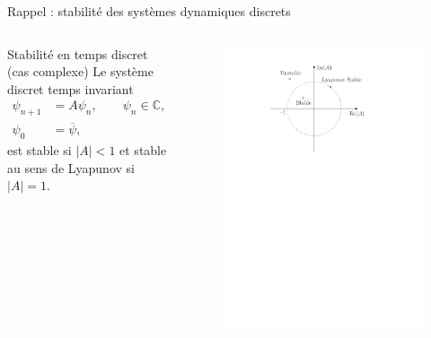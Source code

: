 \documentclass[aspectratio=169, french]{beamer}
\begin{document}
\begin{frame}{Rappel : stabilité des systèmes dynamiques discrets}
	\begin{columns}
		\begin{column}{.5\textwidth}
			\begin{block}{Stabilité en temps discret (cas complexe)}
				Le système discret temps invariant
				\begin{equation*}
					\begin{aligned}
						\psi_{n+1} &= A \psi_n, \qquad \psi_n \in \mathbb{C}, A \in \mathbb{C},\\
						\psi_0 &= \overline{\psi},
					\end{aligned}
				\end{equation*}  
				est stable si $|A|<1$ et stable au sens de Lyapunov si $|A|=1$.
			\end{block}
		\end{column}
		\begin{column}{.5\textwidth}
			\begin{figure}
				\centering
				\includegraphics[height=.7\textheight]{discrete_stability.pdf}
			\end{figure}
		\end{column}
	\end{columns}	
\end{frame}
\end{document}
